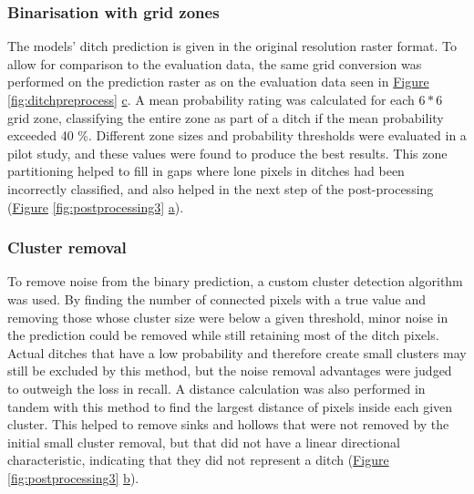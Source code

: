 \documentclass[]{interact}
\theoremstyle{plain}%
\theoremstyle{definition}
\theoremstyle{remark}
\begin{document}
\subsubsection{Binarisation with grid zones}
The models' ditch prediction is given in the original resolution raster format. To allow for comparison to the evaluation data, the same grid conversion was performed on the prediction raster as on the evaluation data seen in \hyperref[fig:ditchpreprocess]{Figure} \ref{fig:ditchpreprocess} \hyperref[fig:ditchpreprocess]{c}. A mean probability rating was calculated for each $6*6$ grid zone, classifying the entire zone as part of a ditch if the mean probability exceeded 40 \%. Different zone sizes and probability thresholds were evaluated in a pilot study, and these values were found to produce the best results. This zone partitioning helped to fill in gaps where lone pixels in ditches had been incorrectly classified, and also helped in the next step of the post-processing (\hyperref[fig:postprocessing3]{Figure} \ref{fig:postprocessing3} \hyperref[fig:postprocessing3]{a}).

\subsubsection{Cluster removal}
To remove noise from the binary prediction, a custom cluster detection algorithm was used. By finding the number of connected pixels with a true value and removing those whose cluster size were below a given threshold, minor noise in the prediction could be removed while still retaining most of the ditch pixels. Actual ditches that have a low probability and therefore create small clusters may still be excluded by this method, but the noise removal advantages were judged to outweigh the loss in recall. A distance calculation was also performed in tandem with this method to find the largest distance of pixels inside each given cluster. This helped to remove sinks and hollows that were not removed by the initial small cluster removal, but that did not have a linear directional characteristic, indicating that they did not represent a ditch (\hyperref[fig:postprocessing3]{Figure} \ref{fig:postprocessing3} \hyperref[fig:postprocessing3]{b}).
\end{document}
